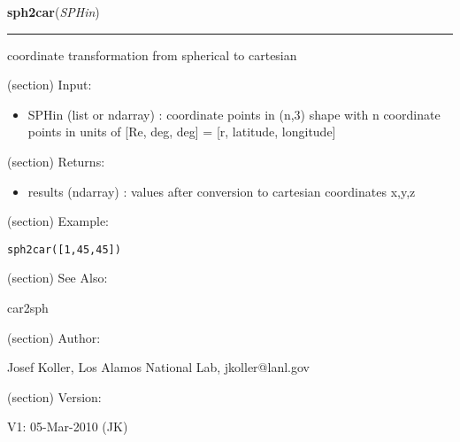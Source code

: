     \label{spacepy:onerapy:sph2car}

    \vspace{0.5ex}

\hspace{.8\funcindent}\begin{boxedminipage}{\funcwidth}

    \raggedright \textbf{sph2car}(\textit{SPHin})

    \vspace{-1.5ex}

    \rule{\textwidth}{0.5\fboxrule}
\setlength{\parskip}{2ex}
    coordinate transformation from spherical to cartesian

    (section) Input:

      \begin{itemize}
      \setlength{\parskip}{0.6ex}
        \item SPHin (list or ndarray) : coordinate points in (n,3) shape with n
          coordinate points in units of [Re, deg, deg] = [r, latitude, 
          longitude]

      \end{itemize}

    (section) Returns:

      \begin{itemize}
      \setlength{\parskip}{0.6ex}
        \item results (ndarray) : values after conversion to cartesian 
          coordinates x,y,z

      \end{itemize}

    (section) Example:

\begin{alltt}
\pysrcprompt{{\textgreater}{\textgreater}{\textgreater} }sph2car([1,45,45])
\end{alltt}
    (section) See Also:

      car2sph

    (section) Author:

      Josef Koller, Los Alamos National Lab, jkoller@lanl.gov

    (section) Version:

      V1: 05-Mar-2010 (JK)

\setlength{\parskip}{1ex}
    \end{boxedminipage}


